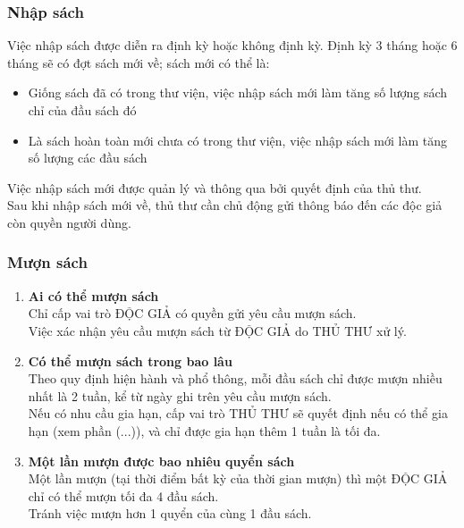 \documentclass[12pt,a4paper]{report}
\begin{document}
			\subsubsection{Nhập sách}
			Việc nhập sách được diễn ra định kỳ hoặc không định kỳ. Định kỳ 3 tháng hoặc 6 tháng sẽ có đợt sách mới về; sách mới có thể là:
			\begin{itemize}
				\item Giống sách đã có trong thư viện, việc nhập sách mới làm tăng số lượng sách chỉ của đầu sách đó
				\item Là sách hoàn toàn mới chưa có trong thư viện, việc nhập sách mới làm tăng số lượng các đầu sách
			\end{itemize}
			Việc nhập sách mới được quản lý và thông qua bởi quyết định của thủ thư.\\
			Sau khi nhập sách mới về, thủ thư cần chủ động gửi thông báo đến các độc giả còn quyền người dùng.\\

			\subsubsection{Mượn sách}
				\begin{enumerate}
				\item \textbf{Ai có thể mượn sách}\\
				Chỉ cấp vai trò ĐỘC GIẢ có quyền gửi yêu cầu mượn sách.\\
				Việc xác nhận yêu cầu mượn sách từ ĐỘC GIẢ do THỦ THƯ xử lý.\\
				\item \textbf{Có thể mượn sách trong bao lâu}\\
				Theo quy định hiện hành và phổ thông, mỗi đầu sách chỉ được mượn nhiều nhất là 2 tuần, kể từ ngày ghi trên yêu cầu mượn sách.\\
				Nếu có nhu cầu gia hạn, cấp vai trò THỦ THƯ sẽ quyết định nếu có thể gia hạn (xem phần (...)), và chỉ được gia hạn thêm 1 tuần là tối đa.\\
				\item \textbf{Một lần mượn được bao nhiêu quyển sách}\\
				Một lần mượn (tại thời điểm bất kỳ của thời gian mượn) thì một ĐỘC GIẢ chỉ có thể mượn tối đa 4 đầu sách.\\
				Tránh việc mượn hơn 1 quyển của cùng 1 đầu sách.\\
				\end{enumerate}
\end{document}
